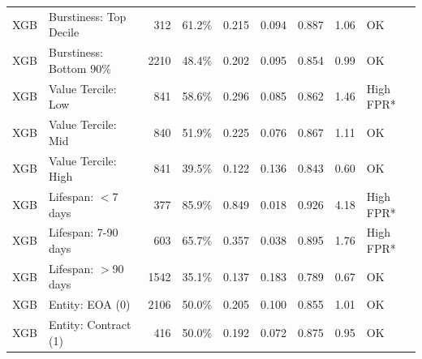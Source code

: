 \begin{table}[!htbp]
\begin{tabularx}{\textwidth}{l l r c c c c c l}
XGB & Burstiness: Top Decile & 312 & 61.2\% & 0.215 & 0.094 & 0.887 & 1.06 & OK \\
XGB & Burstiness: Bottom 90\% & 2210 & 48.4\% & 0.202 & 0.095 & 0.854 & 0.99 & OK \\
XGB & Value Tercile: Low & 841 & 58.6\% & 0.296 & 0.085 & 0.862 & 1.46 & High FPR* \\
XGB & Value Tercile: Mid & 840 & 51.9\% & 0.225 & 0.076 & 0.867 & 1.11 & OK \\
XGB & Value Tercile: High & 841 & 39.5\% & 0.122 & 0.136 & 0.843 & 0.60 & OK \\
XGB & Lifespan: $<$7 days & 377 & 85.9\% & 0.849 & 0.018 & 0.926 & 4.18 & High FPR* \\
XGB & Lifespan: 7-90 days & 603 & 65.7\% & 0.357 & 0.038 & 0.895 & 1.76 & High FPR* \\
XGB & Lifespan: $>$90 days & 1542 & 35.1\% & 0.137 & 0.183 & 0.789 & 0.67 & OK \\
XGB & Entity: EOA (0) & 2106 & 50.0\% & 0.205 & 0.100 & 0.855 & 1.01 & OK \\
XGB & Entity: Contract (1) & 416 & 50.0\% & 0.192 & 0.072 & 0.875 & 0.95 & OK \\
\bottomrule
\end{tabularx}
\end{table}